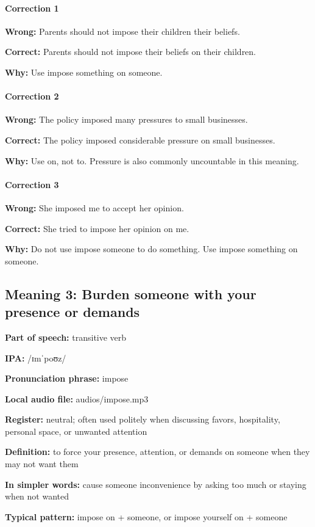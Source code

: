 \documentclass[11pt]{article}
\begin{document}
\paragraph{Correction 1}
\textbf{Wrong:} Parents should not impose their children their beliefs.

\textbf{Correct:} Parents should not impose their beliefs on their children.

\textbf{Why:} Use impose something on someone.

\paragraph{Correction 2}
\textbf{Wrong:} The policy imposed many pressures to small businesses.

\textbf{Correct:} The policy imposed considerable pressure on small businesses.

\textbf{Why:} Use on, not to. Pressure is also commonly uncountable in this meaning.

\paragraph{Correction 3}
\textbf{Wrong:} She imposed me to accept her opinion.

\textbf{Correct:} She tried to impose her opinion on me.

\textbf{Why:} Do not use impose someone to do something. Use impose something on someone.

\subsection{Meaning 3: Burden someone with your presence or demands}
\textbf{Part of speech:} transitive verb

\textbf{IPA:} /ɪmˈpoʊz/

\textbf{Pronunciation phrase:} impose

\textbf{Local audio file:} audios/impose.mp3

\textbf{Register:} neutral; often used politely when discussing favors, hospitality, personal space, or unwanted attention

\textbf{Definition:} to force your presence, attention, or demands on someone when they may not want them

\textbf{In simpler words:} cause someone inconvenience by asking too much or staying when not wanted

\textbf{Typical pattern:} impose on + someone, or impose yourself on + someone
\end{document}
